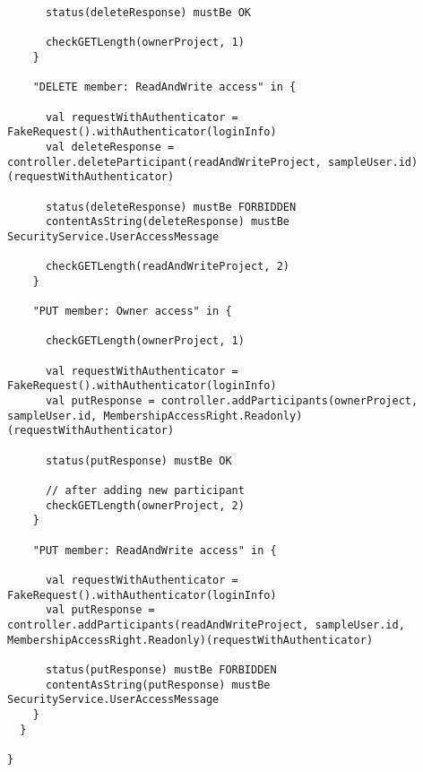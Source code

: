 \begin{lstlisting}
      status(deleteResponse) mustBe OK

      checkGETLength(ownerProject, 1)
    }

    "DELETE member: ReadAndWrite access" in {

      val requestWithAuthenticator = FakeRequest().withAuthenticator(loginInfo)
      val deleteResponse = controller.deleteParticipant(readAndWriteProject, sampleUser.id)(requestWithAuthenticator)

      status(deleteResponse) mustBe FORBIDDEN
      contentAsString(deleteResponse) mustBe SecurityService.UserAccessMessage

      checkGETLength(readAndWriteProject, 2)
    }

    "PUT member: Owner access" in {

      checkGETLength(ownerProject, 1)

      val requestWithAuthenticator = FakeRequest().withAuthenticator(loginInfo)
      val putResponse = controller.addParticipants(ownerProject, sampleUser.id, MembershipAccessRight.Readonly)(requestWithAuthenticator)

      status(putResponse) mustBe OK

      // after adding new participant
      checkGETLength(ownerProject, 2)
    }

    "PUT member: ReadAndWrite access" in {

      val requestWithAuthenticator = FakeRequest().withAuthenticator(loginInfo)
      val putResponse = controller.addParticipants(readAndWriteProject, sampleUser.id, MembershipAccessRight.Readonly)(requestWithAuthenticator)

      status(putResponse) mustBe FORBIDDEN
      contentAsString(putResponse) mustBe SecurityService.UserAccessMessage
    }
  }

}
\end{lstlisting}
